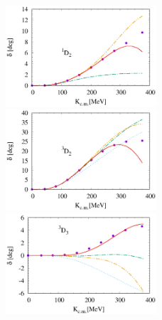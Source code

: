 \documentclass{article}
\begin{document}
\begin{figure}[htbp]
\includegraphics[width=0.5\textwidth]{7_1d2.eps}
\includegraphics[width=0.5\textwidth]{7_3d2.eps}
\includegraphics[width=0.5\textwidth]{7_3d3.eps}
\end{figure}
\end{document}
